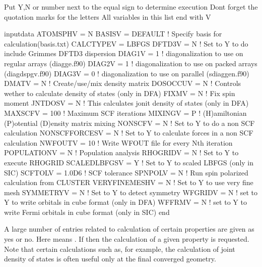 \documentclass[letterpaper,10pt,english,openany,oneside]{sphinxmanual}
\begin{document}
\begin{sphinxVerbatim}[commandchars=\\\{\}]
\PYGZsh{} Put Y,N or number next to the equal sign to determine execution
\PYGZsh{} Don\PYGZsq{}t forget the quotation marks for the letters
\PYGZsh{} All variables in this list end with V

\PYGZam{}input\PYGZus{}data
ATOMSPHV      = \PYGZsq{}N\PYGZsq{}
BASISV        = \PYGZsq{}DEFAULT\PYGZsq{} ! Specify basis for calculation(basis.txt)
CALCTYPEV     = \PYGZsq{}LBFGS\PYGZsq{}
DFTD3V        = \PYGZsq{}N\PYGZsq{} ! Set to Y to do include Grimmes DFT\PYGZhy{}D3 dispersion
DIAG1V        =  1  ! diagonalization to use on regular arrays (diagge.f90)
DIAG2V        =  1  ! diagonalization to use on packed arrays (diag\PYGZus{}dspgv.f90)
DIAG3V        =  0  ! diagonalization to use on parallel (sdiagge\PYGZus{}n.f90)
DMATV         = \PYGZsq{}N\PYGZsq{} ! Create/use/mix density matrix
DOSOCCUV      = \PYGZsq{}N\PYGZsq{} ! Controls wether to calculate density of states (only in DFA)
FIXMV         = \PYGZsq{}N\PYGZsq{} ! Fix spin moment
JNTDOSV       = \PYGZsq{}N\PYGZsq{} ! This calculates jonit density of states (only in DFA)
MAXSCFV       = 100 ! Maximum SCF iterations
MIXINGV       = \PYGZsq{}P\PYGZsq{} ! (H)amiltonian (P)otential (D)ensity matrix mixing
NONSCFV       = \PYGZsq{}N\PYGZsq{} ! Set to Y to do a non SCF calculation
NONSCFFORCESV = \PYGZsq{}N\PYGZsq{} ! Set to Y to calculate forces in a non SCF calculation
NWFOUTV       = 10  ! Write WFOUT file for every N\PYGZhy{}th iteration
POPULATIONV   = \PYGZsq{}N\PYGZsq{} ! Population analysis
RHOGRIDV      = \PYGZsq{}N\PYGZsq{} ! Set to Y to execute RHOGRID
SCALEDLBFGSV  = \PYGZsq{}Y\PYGZsq{} ! Set to Y to scaled LBFGS (only in SIC)
SCFTOLV       = 1.0D\PYGZhy{}6 ! SCF tolerance
SPNPOLV       = \PYGZsq{}N\PYGZsq{} ! Run spin polarized calculation from CLUSTER
VERYFINEMESHV = \PYGZsq{}N\PYGZsq{} ! Set to Y to use very fine mesh
SYMMETRYV     = \PYGZsq{}N\PYGZsq{} ! Set to Y to detect symmetry
WFGRIDV       = \PYGZsq{}N\PYGZsq{} ! set to Y to write orbitals in cube format (only in DFA)
WFFRMV        = \PYGZsq{}N\PYGZsq{} ! set to Y to write Fermi orbitals in cube format (only in SIC)
\PYGZam{}end

\end{sphinxVerbatim}

\sphinxAtStartPar
A large number of entries related to calculation of certain properties are given as yes or no. Here  means . If  then the calculation of a given property is requested. Note that certain calculations such as, for example, the calculation of joint density of states is often useful only at the final converged geometry.
\end{document}
